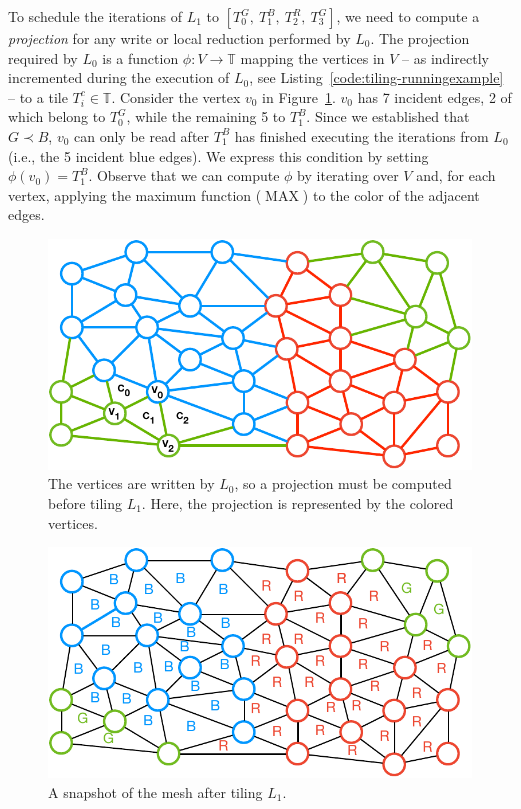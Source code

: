 To schedule the iterations of $L_1$ to $[T_0^G,\ T_1^B,\ T_2^R,\ T_3^G]$, we need to compute a \textit{projection} for any write or local reduction performed by $L_0$. The projection required by $L_0$ is a function $\phi : V \rightarrow \mathbb{T}$ mapping the vertices in $V$ -- as indirectly incremented during the execution of $L_0$, see Listing~\ref{code:tiling-runningexample} -- to a tile $T_i^c \in \mathbb{T}$. Consider the vertex $v_0$ in Figure~\ref{fig:st-loop-0-proj}. $v_0$ has 7 incident edges, 2 of which belong to $T_0^G$, while the remaining 5 to $T_1^B$. Since we established that $G \prec B$, $v_0$ can only be read after $T_1^B$ has finished executing the iterations from $L_0$ (i.e., the 5 incident blue edges). We express this condition by setting $\phi(v_0) = T_1^B$. Observe that we can compute $\phi$ by iterating over $V$ and, for each vertex, applying the maximum function ($\operatorname{MAX}$) to the color of the adjacent edges. 

\begin{figure}
\centering
\includegraphics[scale=0.6]{sparsetiling/figures/loop_0_with_vertices.pdf}
\caption{The vertices are written by $L_0$, so a projection must be computed before tiling $L_1$. Here, the projection is represented by the colored vertices.}
\label{fig:st-loop-0-proj}
\end{figure}

\begin{figure}
\centering
\includegraphics[scale=0.6]{sparsetiling/figures/loop_1.pdf}
\caption{A snapshot of the mesh after tiling $L_1$.}
\label{fig:st-loop-1}
\end{figure}

